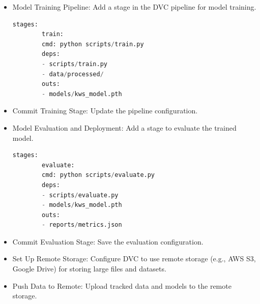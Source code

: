 \begin{itemize}
	\medskip
	
	
	
	
	\medskip
	
	
	\item Model Training Pipeline: Add a stage in the DVC pipeline for model training.
	
	\begin{lstlisting}[language=python]
		stages:
		train:
		cmd: python scripts/train.py
		deps:
		- scripts/train.py
		- data/processed/
		outs:
		- models/kws_model.pth
	\end{lstlisting}
	
	\item Commit Training Stage: Update the pipeline configuration.
			
	\medskip
	
	
	
	
	\medskip
	
	
	\item Model Evaluation and Deployment: Add a stage to evaluate the trained model.
	
	\begin{lstlisting}[language=python]
		stages:
		evaluate:
		cmd: python scripts/evaluate.py
		deps:
		- scripts/evaluate.py
		- models/kws_model.pth
		outs:
		- reports/metrics.json
	\end{lstlisting}
	
	\item Commit Evaluation Stage: Save the evaluation configuration.
			
	\medskip
	
	
	
	
	\medskip
	
	
	\item Set Up Remote Storage: Configure DVC to use remote storage (e.g., AWS S3, Google Drive) for storing large files and datasets.
			
	\medskip
	
	
	
	\medskip
	
	
	\item Push Data to Remote: Upload tracked data and models to the remote storage.
			

\end{itemize}
